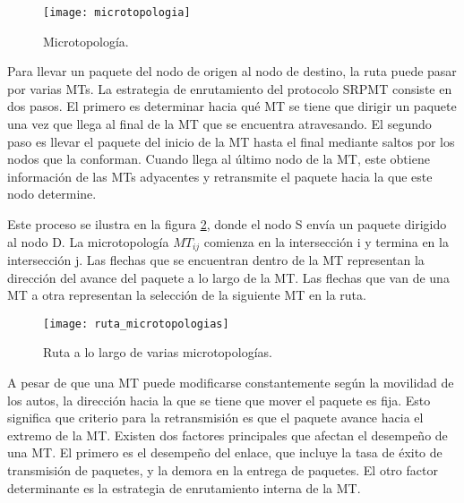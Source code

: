 \begin{figure}[th]
\centering
\texttt{[image: microtopologia]}
\decoRule
\caption[Microtopología]{Microtopología\protect\footnotemark.}
\label{fig:microtopologia}
\end{figure}


Para llevar un paquete del nodo de origen al nodo de destino, la ruta puede
pasar por varias MTs. La estrategia de enrutamiento del protocolo SRPMT consiste
en dos pasos. El primero es determinar hacia qué MT se tiene que dirigir un
paquete una vez que llega al final de la MT que se encuentra atravesando. El
segundo paso es llevar el paquete del inicio de la MT hasta el final mediante
saltos por los nodos que la conforman. Cuando llega al último nodo de la MT,
este obtiene información de las MTs adyacentes y retransmite el paquete hacia
la que este nodo determine.

Este proceso se ilustra en la figura \ref{fig:ruta_microtopologias}, donde el
nodo S envía un paquete dirigido al nodo D. La microtopología $MT_{ij}$ comienza
en la intersección i y termina en la intersección j. Las flechas que se
encuentran dentro de la MT representan la dirección del avance del paquete a lo
largo de la MT. Las flechas que van de una MT a otra representan la selección
de la siguiente MT en la ruta.

\begin{figure}[th]
\centering
\texttt{[image: ruta\_microtopologias]}
\decoRule
\caption[Ruta a lo largo de varias microtopologías]{Ruta a lo largo de
varias microtopologías\protect\footnotemark.}
\label{fig:ruta_microtopologias}
\end{figure}


A pesar de que una MT puede modificarse constantemente según la movilidad de los
autos, la dirección hacia la que se tiene que mover el paquete es fija. Esto
significa que criterio para la retransmisión es que el paquete avance hacia el
extremo de la MT. Existen dos factores principales que afectan el desempeño de
una MT. El primero es el desempeño del enlace, que incluye la tasa de éxito de
transmisión de paquetes, y la demora en la entrega de paquetes. El otro factor
determinante es la estrategia de enrutamiento interna de la MT.


